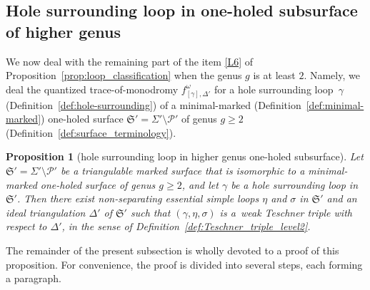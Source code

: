 \documentclass[pdftex]{sigma}
\numberwithin{equation}{section}
\newtheorem{Proposition}[Theorem]{Proposition}
\theoremstyle{definition}
\begin{document}
\subsection{Hole surrounding loop in one-holed subsurface of higher genus}
\label{subsec:hole-surrounding_loop_in_one-holed_subsurface}
We now deal with the remaining part of the item \ref{L6} of Proposition~\ref{prop:loop_classification} when the genus $g$ is at least $2$. Namely, we deal the quantized trace-of-monodromy $f^\omega_{[\gamma],\Delta'}$ for a hole surrounding loop~$\gamma$ (Definition~\ref{def:hole-surrounding}) of a minimal-marked (Definition~\ref{def:minimal-marked}) one-holed surface $\mathfrak{S}' = \Sigma'\setminus\mathcal{P}'$ of genus $g\ge 2$ (Definition~\ref{def:surface_terminology}).
\begin{Proposition}[hole surrounding loop in higher genus one-holed subsurface]
\label{prop:hole-surrounding_loop_in_higher_genus_one-holed_subsurface}
Let $\mathfrak{S}'=\Sigma'\setminus\mathcal{P}'$ be a triangulable marked surface that is
isomorphic to a minimal-marked one-holed surface of genus $g\ge 2$, and let $\gamma$ be a hole surrounding loop in $\mathfrak{S}'$. Then there exist non-separating essential simple loops $\eta$ and $\sigma$ in $\mathfrak{S}'$ and an ideal triangulation $\Delta'$ of $\mathfrak{S}'$ such that $(\gamma,\eta,\sigma)$ is a~weak Teschner triple with respect to $\Delta'$, in the sense of Definition~{\rm \ref{def:Teschner_triple_level2}}.
\end{Proposition}
The remainder of the present subsection is wholly devoted to a proof of this proposition. For convenience, the proof is divided into several steps, each forming a paragraph.
\end{document}
